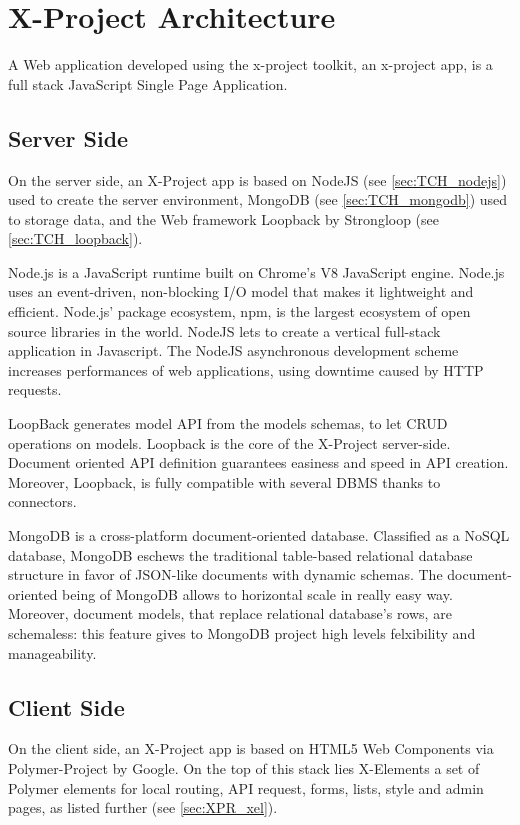 \section{X-Project Architecture}
\label{sec:XPR_arc}

A Web application developed using the x-project toolkit, an x-project app, is a full stack JavaScript Single Page Application.

\subsection{Server Side}
\label{subsec:XPR_arc_serv}

On the server side, an X-Project app is based on NodeJS (see \ref{sec:TCH_nodejs}) used to create the server environment, MongoDB (see \ref{sec:TCH_mongodb}) used to storage data, and the Web framework Loopback by Strongloop (see \ref{sec:TCH_loopback}).

Node.js is a JavaScript runtime built on Chrome's V8 JavaScript engine. Node.js uses an event-driven, non-blocking I/O model that makes it lightweight and efficient. Node.js' package ecosystem, npm, is the largest ecosystem of open source libraries in the world. 
NodeJS lets to create a vertical full-stack application in Javascript. The NodeJS asynchronous development scheme increases performances of web applications, using downtime caused by HTTP requests.

LoopBack generates model API from the models schemas, to let CRUD operations on models.
Loopback is the core of the X-Project server-side. Document oriented API definition guarantees easiness and speed in API creation. Moreover, Loopback, is fully compatible with several DBMS thanks to connectors. 

MongoDB is a cross-platform document-oriented database. Classified as a NoSQL database, MongoDB eschews the traditional table-based relational database structure in favor of JSON-like documents with dynamic schemas.
The document-oriented being of MongoDB allows to horizontal scale in really easy way. Moreover, document models, that replace relational database's rows, are schemaless: this feature gives to MongoDB project high levels felxibility and manageability.


\subsection{Client Side}
\label{subsec:XPR_arc_clie}

On the client side, an X-Project app is based on HTML5 Web Components via Polymer-Project by Google.
On the top of this stack lies X-Elements a set of Polymer elements for local routing, API request, forms, lists, style and admin pages, as listed further (see \ref{sec:XPR_xel}).

